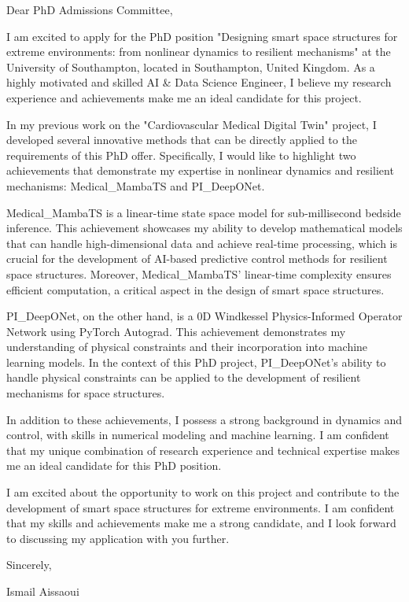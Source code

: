 \documentclass{letter}
\begin{document}
\opening{Dear PhD Admissions Committee,}

I am excited to apply for the PhD position "Designing smart space structures for extreme environments: from nonlinear dynamics to resilient mechanisms" at the University of Southampton, located in Southampton, United Kingdom. As a highly motivated and skilled AI & Data Science Engineer, I believe my research experience and achievements make me an ideal candidate for this project.

In my previous work on the "Cardiovascular Medical Digital Twin" project, I developed several innovative methods that can be directly applied to the requirements of this PhD offer. Specifically, I would like to highlight two achievements that demonstrate my expertise in nonlinear dynamics and resilient mechanisms: Medical_MambaTS and PI_DeepONet.

Medical_MambaTS is a linear-time state space model for sub-millisecond bedside inference. This achievement showcases my ability to develop mathematical models that can handle high-dimensional data and achieve real-time processing, which is crucial for the development of AI-based predictive control methods for resilient space structures. Moreover, Medical_MambaTS' linear-time complexity ensures efficient computation, a critical aspect in the design of smart space structures.

PI_DeepONet, on the other hand, is a 0D Windkessel Physics-Informed Operator Network using PyTorch Autograd. This achievement demonstrates my understanding of physical constraints and their incorporation into machine learning models. In the context of this PhD project, PI_DeepONet's ability to handle physical constraints can be applied to the development of resilient mechanisms for space structures.

In addition to these achievements, I possess a strong background in dynamics and control, with skills in numerical modeling and machine learning. I am confident that my unique combination of research experience and technical expertise makes me an ideal candidate for this PhD position.

I am excited about the opportunity to work on this project and contribute to the development of smart space structures for extreme environments. I am confident that my skills and achievements make me a strong candidate, and I look forward to discussing my application with you further.

\closing{Sincerely,}

Ismail Aissaoui
\end{document}

